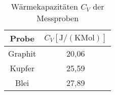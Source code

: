 \begin{table}[h]
	\begin{center}
		\begin{tabular}{cc}
		  	Probe&$C_V [\text{J}/(\text{K} \text{Mol})]$ \\ \hline
			Graphit&20,06\\
			Kupfer&25,59\\
			Blei&27,89
		\end{tabular}
		\caption{Wärmekapazitäten $C_V$ der Messproben}
		\label{tabdiss1}
	\end{center}
\end{table}
